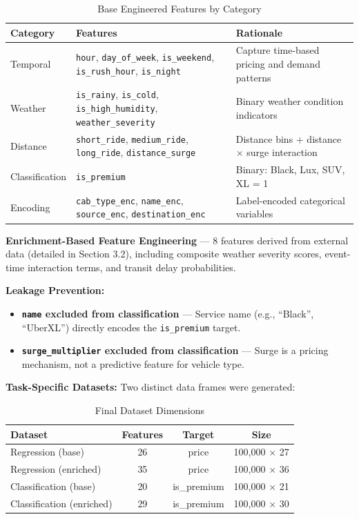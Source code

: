 \documentclass[12pt,a4paper]{article}
\begin{document}
\begin{table}[H]
\centering
\caption{Base Engineered Features by Category}
\begin{tabular}{lp{4cm}p{5.5cm}}
\toprule
\textbf{Category} & \textbf{Features} & \textbf{Rationale} \\
\midrule
Temporal & \texttt{hour}, \texttt{day\_of\_week}, \texttt{is\_weekend}, \texttt{is\_rush\_hour}, \texttt{is\_night} & Capture time-based pricing and demand patterns \\
Weather & \texttt{is\_rainy}, \texttt{is\_cold}, \texttt{is\_high\_humidity}, \texttt{weather\_severity} & Binary weather condition indicators \\
Distance & \texttt{short\_ride}, \texttt{medium\_ride}, \texttt{long\_ride}, \texttt{distance\_surge} & Distance bins + distance $\times$ surge interaction \\
Classification & \texttt{is\_premium} & Binary: Black, Lux, SUV, XL = 1 \\
Encoding & \texttt{cab\_type\_enc}, \texttt{name\_enc}, \texttt{source\_enc}, \texttt{destination\_enc} & Label-encoded categorical variables \\
\bottomrule
\end{tabular}
\end{table}

\textbf{Enrichment-Based Feature Engineering} --- 8 features derived from external data (detailed in Section 3.2), including composite weather severity scores, event-time interaction terms, and transit delay probabilities.

\textbf{Leakage Prevention:}
\begin{itemize}
    \item \textbf{\texttt{name} excluded from classification} --- Service name (e.g., ``Black'', ``UberXL'') directly encodes the \texttt{is\_premium} target.
    \item \textbf{\texttt{surge\_multiplier} excluded from classification} --- Surge is a pricing mechanism, not a predictive feature for vehicle type.
\end{itemize}

\textbf{Task-Specific Datasets:} Two distinct data frames were generated:

\begin{table}[H]
\centering
\caption{Final Dataset Dimensions}
\begin{tabular}{lccc}
\toprule
\textbf{Dataset} & \textbf{Features} & \textbf{Target} & \textbf{Size} \\
\midrule
Regression (base) & 26 & price & 100,000 $\times$ 27 \\
Regression (enriched) & 35 & price & 100,000 $\times$ 36 \\
Classification (base) & 20 & is\_premium & 100,000 $\times$ 21 \\
Classification (enriched) & 29 & is\_premium & 100,000 $\times$ 30 \\
\bottomrule
\end{tabular}
\end{table}
\end{document}

